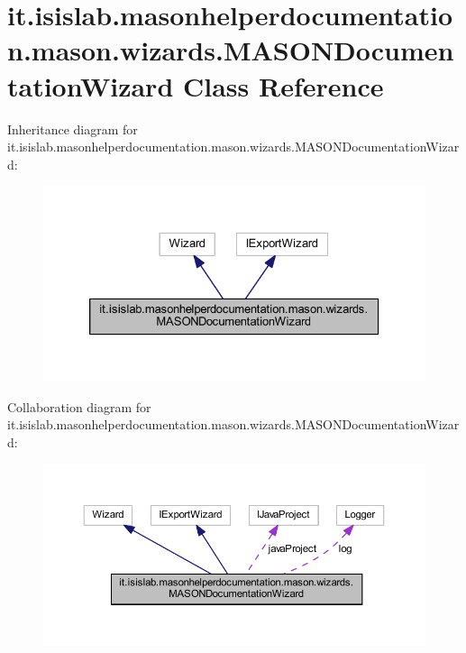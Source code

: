 \hypertarget{classit_1_1isislab_1_1masonhelperdocumentation_1_1mason_1_1wizards_1_1_m_a_s_o_n_documentation_wizard}{\section{it.\-isislab.\-masonhelperdocumentation.\-mason.\-wizards.\-M\-A\-S\-O\-N\-Documentation\-Wizard Class Reference}
\label{classit_1_1isislab_1_1masonhelperdocumentation_1_1mason_1_1wizards_1_1_m_a_s_o_n_documentation_wizard}
}


Inheritance diagram for it.\-isislab.\-masonhelperdocumentation.\-mason.\-wizards.\-M\-A\-S\-O\-N\-Documentation\-Wizard\-:\nopagebreak
\begin{figure}[H]
\begin{center}
\leavevmode
\includegraphics[width=326pt]{classit_1_1isislab_1_1masonhelperdocumentation_1_1mason_1_1wizards_1_1_m_a_s_o_n_documentation_wizard__inherit__graph}
\end{center}
\end{figure}


Collaboration diagram for it.\-isislab.\-masonhelperdocumentation.\-mason.\-wizards.\-M\-A\-S\-O\-N\-Documentation\-Wizard\-:\nopagebreak
\begin{figure}[H]
\begin{center}
\leavevmode
\includegraphics[width=350pt]{classit_1_1isislab_1_1masonhelperdocumentation_1_1mason_1_1wizards_1_1_m_a_s_o_n_documentation_wizard__coll__graph}
\end{center}
\end{figure}
